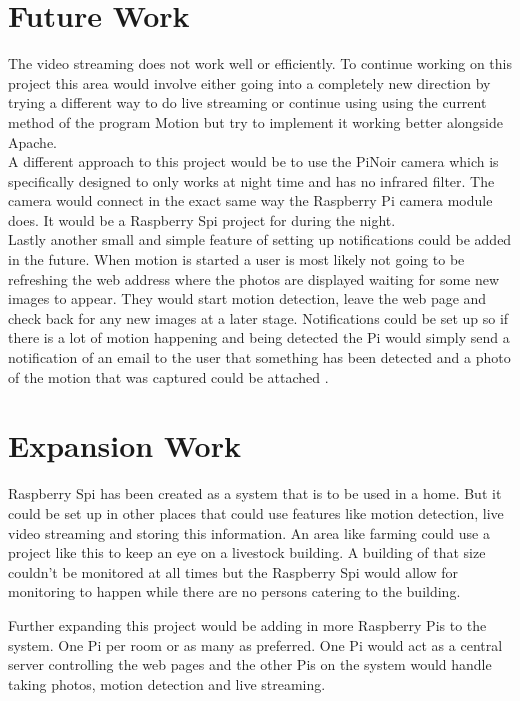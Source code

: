 \documentclass[]{report}
\begin{document}
\section{Future Work}
\label{sec:future}

The video streaming does not work well or efficiently. To continue working on this project this area would involve either going into a completely new direction by trying a different way to do live streaming or continue using using the current method of the program Motion but try to implement it working better alongside Apache.\\

A different approach to this project would be to use the PiNoir camera which is specifically designed to only works at night time and has no infrared filter. The camera would connect in the exact same way the Raspberry Pi camera module does. It would be a Raspberry Spi project for during the night.\\

Lastly another small and simple feature of setting up notifications could be added in the future. When motion is started a user is most likely not going to be refreshing the web address where the photos are displayed waiting for some new images to appear. They would start motion detection, leave the web page and check back for any new images at a later stage. Notifications could be set up so if there is a lot of motion happening and being detected the Pi would simply send a notification of an email to the user that something has been detected and a photo of the motion that was captured could be attached
.\\

\section{Expansion Work}
\label{sec:expansion}

Raspberry Spi has been created as a system that is to be used in a home. But it could be set up in other places that could use features like motion detection, live video streaming and storing this information. An area like farming could use a project like this to keep an eye on a livestock building. A building of that size couldn’t be monitored at all times but the Raspberry Spi would allow for monitoring to happen while there are no persons catering to the building.

Further expanding this project would be adding in more Raspberry Pis to the system. One Pi per room or as many as preferred. One Pi would act as a central server controlling the web pages and the other Pis on the system would handle taking photos, motion detection and live streaming. \\
\end{document}

